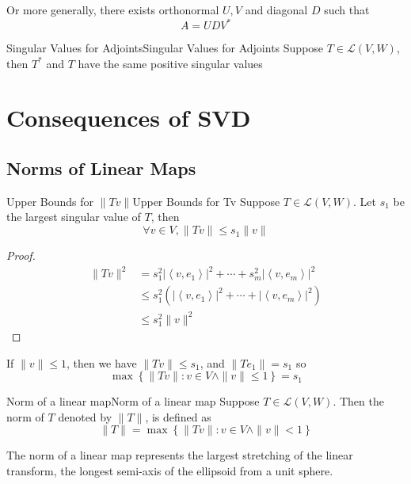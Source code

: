 \documentclass[../main.tex]{subfiles}
\begin{document}
Or more generally, there exists orthonormal $U,V$ and diagonal $D$ such that
\begin{equation}
A = UDV^*
\end{equation}


\begin{theorem}{Singular Values for Adjoints}{Singular Values for Adjoints}
Suppose $T\in \mathscr{L}(V,W)$, then $T^*$ and $T$ have the same positive singular values
\end{theorem}

\section{Consequences of SVD}
\subsection{Norms of Linear Maps}
\begin{theorem}{Upper Bounds for $\|Tv\|$}{Upper Bounds for Tv}
Suppose $T\in \mathscr{L}(V,W)$. Let $s_1$ be the largest singular value of $T$, then
\begin{equation*}
\forall v\in V,\|Tv\| \leq s_1 \|v\|
\end{equation*}
\end{theorem}
\begin{proof}
\begin{equation*}
\begin{aligned}
	\|Tv\|^2 &= s_1^2 \left|\left<v,e_1\right>\right|^2 +\cdots +s_m^2 \left|\left<v,e_m\right>\right|^2\\
		 & \leq s_1^2 \left(\left|\left<v,e_1\right>\right|^2 +\cdots + \left|\left<v,e_m\right>\right|^2\right)\\
		 & \leq s_1^2 \|v\|^2
\end{aligned}
\end{equation*}
\end{proof}

If $\|v\| \leq 1$, then we have $\|Tv\| \leq s_1$, and $\|Te_1\| = s_1$ so
\begin{equation*}
\max \left\{ \|Tv\|:v\in V \land \|v\|\leq 1 \right\} = s_1
\end{equation*}

\begin{definition}{Norm of a linear map}{Norm of a linear map}
Suppose $T\in \mathscr{L}(V,W)$. Then the norm of $T$ denoted by $\|T\|$, is defined as
\begin{equation*}
\|T\| = \max \left\{ \|Tv\|: v\in V \land \|v\| <1 \right\}
\end{equation*}
\end{definition}
\begin{remark}
The norm of a linear map represents the largest stretching of the linear transform, the longest semi-axis of the ellipsoid from a unit sphere.
\end{remark}
\end{document}
